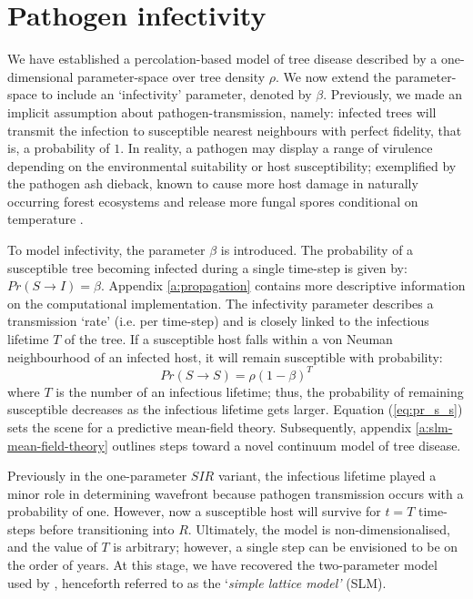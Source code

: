 

\section{Pathogen infectivity}
\label{ch3:two-param-model}

We have established a percolation-based model of tree disease described by a one-dimensional parameter-space over tree density $\rho$. %
We now extend the parameter-space to include an `infectivity' parameter, denoted by $\beta$. %
Previously, we made an implicit assumption about pathogen-transmission, namely: 
infected trees will transmit the infection to susceptible nearest neighbours with perfect fidelity, that is, a probability of $1$. 
In reality, a pathogen may display a range of virulence depending on the environmental suitability or host susceptibility; 
exemplified by the pathogen ash dieback, known to cause more host damage in naturally occurring forest ecosystems \cite{marciulyniene2017can} 
and release more fungal spores conditional on temperature \cite{chandelier2014detection}.

To model infectivity, the parameter $\beta$ is introduced. The probability of a susceptible tree becoming infected during a single time-step is given by: $Pr(S \rightarrow I) = \beta$. Appendix \ref{a:propagation} contains more descriptive information on the computational implementation. 
The infectivity parameter describes a transmission `rate' (i.e. per time-step) and is closely linked to the infectious lifetime $T$ of the tree. %
If a susceptible host falls within a von Neuman neighbourhood of an infected host, it will remain susceptible with probability:
\begin{equation}
\label{eq:pr_s_s}
    Pr(S \rightarrow S) = \rho(1 -\beta)^T
\end{equation}
where $T$ is the number of an infectious lifetime;
thus, the probability of remaining susceptible decreases as the infectious lifetime gets larger.
Equation (\ref{eq:pr_s_s}) sets the scene for a predictive mean-field theory.
Subsequently, appendix \ref{a:slm-mean-field-theory} outlines steps toward a novel continuum model of tree disease.


Previously in the one-parameter $SIR$ variant, the infectious lifetime played a minor role in determining wavefront because pathogen transmission occurs with a probability of one.
However, now a susceptible host will survive for $t=T$ time-steps before transitioning into $R$. Ultimately, the model is non-dimensionalised, and the value of $T$ is arbitrary; however, a single step can be envisioned to be on the order of years.
At this stage, we have recovered the two-parameter model used by \cite{OROZCOFUENTES201912}, henceforth referred to as the `\textit{simple lattice model'} (SLM). 

